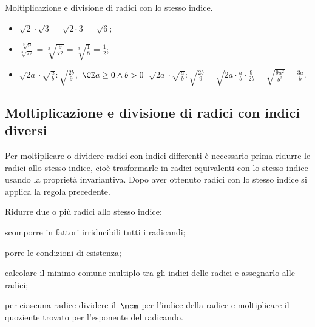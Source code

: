 \begin{exrig}
 \begin{esempio}
Moltiplicazione e divisione di radici con lo stesso indice.
\begin{itemize}
\item $\sqrt 2\cdot \sqrt 3=\sqrt{2\cdot 3}=\sqrt 6$;
\item $\frac{\sqrt[3]9}{\sqrt[3]{72}}=\sqrt[3]{\frac 9{72}}=\sqrt[3]{\frac 1 8}=\frac 1 2$;
\item $\sqrt{2a}\cdot \sqrt{\frac a b}:\sqrt{\frac {2b} 9}$,\, $\CE a\ge 0\wedge b>0$\, $\sqrt{2a}\cdot \sqrt{\frac a b}:\sqrt{\frac {2b} 9}=\sqrt{2a\cdot \frac a b\cdot \frac 9{2b}}=\sqrt{\frac{9a^2}{b^2}}=\frac {3a} b$.
\end{itemize}
 \end{esempio}
\end{exrig}

\subsection{Moltiplicazione e divisione di radici con indici diversi}
Per moltiplicare o dividere radici con indici differenti è necessario prima ridurre le radici allo stesso indice, cioè trasformarle in radici equivalenti con lo stesso indice usando la proprietà invariantiva. Dopo aver ottenuto radici con lo stesso indice si applica la regola precedente.

\begin{procedura}
Ridurre due o più radici allo stesso indice:
\begin{enumeratea}
 \item scomporre in fattori irriducibili tutti i radicandi;
 \item porre le condizioni di esistenza;
 \item calcolare il minimo comune multiplo tra gli indici delle radici e assegnarlo alle radici;
 \item per ciascuna radice dividere il~$\mcm$ per l'indice della radice e moltiplicare il quoziente trovato per l'esponente del radicando.
\end{enumeratea}
\end{procedura}

